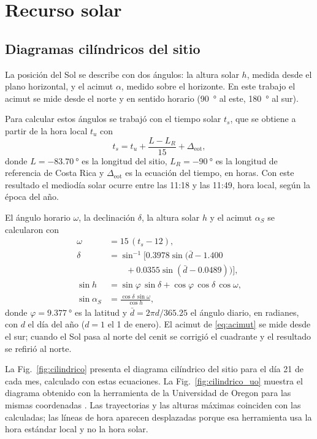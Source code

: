 \section{Recurso solar}\label{sec:recurso}

\subsection{Diagramas cilíndricos del sitio}

La posición del Sol se describe con dos ángulos: la altura solar $h$, medida desde el plano horizontal, y el acimut $\alpha$, medido sobre el horizonte. En este trabajo el acimut se mide desde el norte y en sentido horario (\SI{90}{\degree} al este, \SI{180}{\degree} al sur).

Para calcular estos ángulos se trabajó con el tiempo solar $t_s$, que se obtiene a partir de la hora local $t_u$ con
\begin{equation}
t_s = t_u + \frac{L - L_R}{15} + \Delta_{\mathrm{eot}},
\label{eq:ts}
\end{equation}
donde $L=\SI{-83.70}{\degree}$ es la longitud del sitio, $L_R=\SI{-90}{\degree}$ es la longitud de referencia de Costa Rica y $\Delta_{\mathrm{eot}}$ es la ecuación del tiempo, en horas. Con este resultado el mediodía solar ocurre entre las 11:18 y las 11:49, hora local, según la época del año.

El ángulo horario $\omega$, la declinación $\delta$, la altura solar $h$ y el acimut $\alpha_S$ se calcularon con
\begin{align}
\omega &= 15\,(t_s - 12), \label{eq:omega}\\
\delta &= \sin^{-1}\!\big[0.3978\sin\!\big(\bar d - 1.400 \nonumber\\ &\qquad + 0.0355\sin(\bar d - 0.0489)\big)\big], \label{eq:decl}\\
\sin h &= \sin\varphi\,\sin\delta + \cos\varphi\,\cos\delta\,\cos\omega, \label{eq:altura}\\
\sin \alpha_S &= \frac{\cos\delta\,\sin\omega}{\cos h}, \label{eq:acimut}
\end{align}
donde $\varphi=\SI{9.377}{\degree}$ es la latitud y $\bar d = 2\pi d/365.25$ el ángulo diario, en radianes, con $d$ el día del año ($d=1$ el 1 de enero). El acimut de \eqref{eq:acimut} se mide desde el sur; cuando el Sol pasa al norte del cenit se corrigió el cuadrante y el resultado se refirió al norte.

La Fig.~\ref{fig:cilindrico} presenta el diagrama cilíndrico del sitio para el día 21 de cada mes, calculado con estas ecuaciones. La Fig.~\ref{fig:cilindrico_uo} muestra el diagrama obtenido con la herramienta de la Universidad de Oregon para las mismas coordenadas \cite{uoregon}. Las trayectorias y las alturas máximas coinciden con las calculadas; las líneas de hora aparecen desplazadas porque esa herramienta usa la hora estándar local y no la hora solar.

